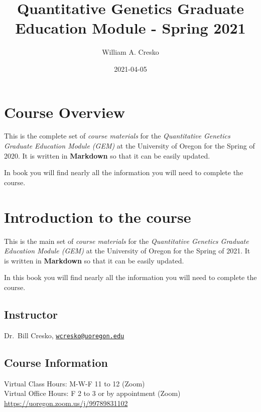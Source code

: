 \documentclass[
]{book}
\title{Quantitative Genetics Graduate Education Module - Spring 2021}
\author{William A. Cresko}
\date{2021-04-05}
\begin{document}
\maketitle

{
\setcounter{tocdepth}{1}
\tableofcontents
}
\hypertarget{course-overview}{%
\chapter{Course Overview}\label{course-overview}}

This is the complete set of \emph{course materials} for the \emph{Quantitative Genetics Graduate Education Module (GEM)} at the University of Oregon for the Spring of 2020. It is written in \textbf{Markdown} so that it can be easily updated.

In book you will find nearly all the information you will need to complete the course.

\hypertarget{introduction-to-the-course}{%
\chapter{Introduction to the course}\label{introduction-to-the-course}}

This is the main set of \emph{course materials} for the \emph{Quantitative Genetics Graduate Education Module (GEM)} at the University of Oregon for the Spring of 2021. It is written in \textbf{Markdown} so that it can be easily updated.

In this book you will find nearly all the information you will need to complete the course.

\hypertarget{instructor}{%
\section{Instructor}\label{instructor}}

Dr.~Bill Cresko, \href{mailto:wcresko@uoregon.edu}{\nolinkurl{wcresko@uoregon.edu}}

\hypertarget{course-information}{%
\section{Course Information}\label{course-information}}

Virtual Class Hours: M-W-F 11 to 12 (Zoom)\\
Virtual Office Hours: F 2 to 3 or by appointment (Zoom)\\
\url{https://uoregon.zoom.us/j/99789831102}
\end{document}
